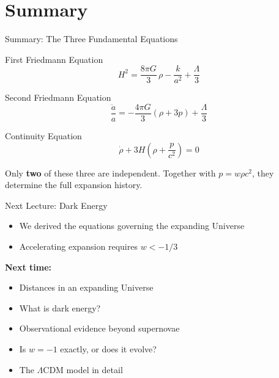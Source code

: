 \documentclass[aspectratio=169,11pt]{beamer}
\newcommand{\Lcdm}{\Lambda\mathrm{CDM}}
\begin{document}
\section{Summary}

\begin{frame}{Summary: The Three Fundamental Equations}

\begin{alertblock}{First Friedmann Equation}
\vspace{-0.15cm}
\begin{equation*}
    H^2 = \frac{8\pi G}{3}\,\rho - \frac{k}{a^2} + \frac{\Lambda}{3}
\end{equation*}
\vspace{-0.3cm}
\end{alertblock}

\begin{alertblock}{Second Friedmann Equation}
\vspace{-0.15cm}
\begin{equation*}
    \frac{\ddot{a}}{a} = -\frac{4\pi G}{3}(\rho+3p) + \frac{\Lambda}{3}
\end{equation*}
\vspace{-0.3cm}
\end{alertblock}

\begin{alertblock}{Continuity Equation}
\vspace{-0.15cm}
\begin{equation*}
    \dot{\rho}+3H\!\left(\rho+\frac{p}{c^2}\right)=0
\end{equation*}
\vspace{-0.3cm}
\end{alertblock}

Only \textbf{two} of these three are independent. Together with $p=w\rho c^2$, they determine the full expansion history.
\end{frame}

\begin{frame}{Next Lecture: Dark Energy}
\begin{itemize}
    \item We derived the equations governing the expanding Universe
    \item Accelerating expansion requires $w<-1/3$
\end{itemize}
\vspace{0.3cm}
\textbf{Next time:}
\begin{itemize}
    \item Distances in an expanding Universe
    \item What is dark energy?
    \item Observational evidence beyond supernovae
    \item Is $w=-1$ exactly, or does it evolve?
    \item The $\Lcdm$ model in detail
\end{itemize}
\end{frame}
\end{document}
